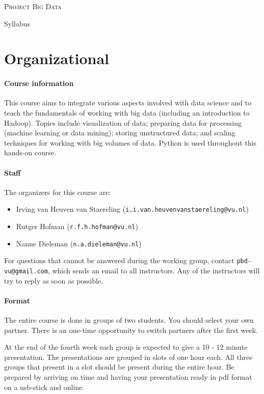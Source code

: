 \documentclass[a4paper]{report}
\newcommand{\blankline}{\par\vspace{5mm}}
\begin{document}
	
\begin{center}
	\textsc{\Large Project Big Data}
	\blankline
	{\large Syllabus}
\end{center}

\noindent\hrulefill

\section*{Organizational}

\paragraph{Course information}
This course aims to integrate various aspects involved with data science and to teach the fundamentals of working with big data (including an
introduction to Hadoop). Topics include visualization of data; preparing data for processing (machine learning or data mining); storing unstructured data; and scaling techniques for working with big volumes of data. Python is used throughout this hands-on course.

\paragraph{Staff}
The organizers for this course are:
\begin{itemize}
	\setlength\itemsep{0mm}
	\item Irving van Heuven van Staereling (\texttt{i.i.van.heuvenvanstaereling@vu.nl})
	\item Rutger Hofman (\texttt{r.f.h.hofman@vu.nl})
	\item Nanne Dieleman (\texttt{n.a.dieleman@vu.nl})
\end{itemize}
For questions that cannot be answered during the working group, contact \texttt{pbd-vu@gmail.com}, which sends an email to all instructors. Any of the instructors will try to reply as soon as possible.

\paragraph{Format}
The entire course is done in groups of two students. You should select your own partner. There is an one-time opportunity to switch partners after the first week.

At the end of the fourth week each group is expected to give a 10 - 12 minute presentation. The presentations are grouped in slots of one hour each. All three groups that present in a slot should be present during the entire hour. Be prepared by arriving on time and having your presentation ready in pdf format on a usb-stick and online.
\end{document}
